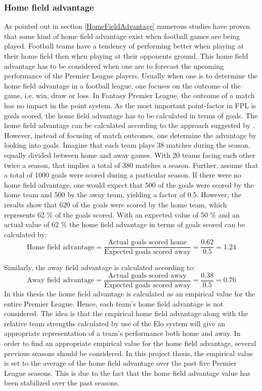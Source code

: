\subsubsection{Home field advantage}
As pointed out in section \ref{HomeFieldAdvantage} numerous studies have proven that some kind of home field advantage exist when football games are being played. Football teams have a tendency of performing better when playing at their home field then when playing at their opponents ground. This home field advantage has to be considered when one are to forecast the upcoming performance of the Premier League players. 
\newpar
Usually when one is to determine the home field advantage in a football league, one focuses on the outcome of the game, i.e.  win, draw or loss. In Fantasy Premier League, the outcome of a match has no impact in the point system. As the most important point-factor in FPL is goals scored, the home field advantage has to be calculated in terms of goals. 
\newpar
The home field advantage can be calculated according to the approach suggested by \cite{Pollard}. However, instead of focusing of match outcomes, one determine the advantage by looking into goals. Imagine that each team plays 38 matches during the season, equally divided between home and away games. With 20 teams facing each other twice a season, that implies a total of 380 matches a season. Further, assume that a total of 1000 goals were scored during a particular season. If there were no home field advantage, one would expect that 500 of the goals were scored by the home team and 500 by the away team, yielding a factor of 0.5. However, the results show that 620 of the goals were scored by the home team, which represents 62 \% of the goals scored. With an expected value of 50 \% and an actual value of 62 \% the home field advantage in terms of goals scored can be calculated by: 
\begin{equation*}
    \textrm{Home field advantage} = \frac{\textrm{Actual goals scored home}}{\textrm{Expected goals scored away}} = \frac{0.62}{0.5} = 1.24 
\end{equation*}

Similarly, the away field advantage is calculated according to:
\begin{equation*}
    \textrm{Away field advantage} = \frac{\textrm{Actual goals scored away}}{\textrm{Expected goals scored away}} = \frac{0.38}{0.5} = 0.76
\end{equation*}
\newpar
In this thesis the home field advantage is calculated as an empirical value for the entire Premier League. Hence, each team's home field advantage is not considered. The idea is that the empirical home field advantage along with the relative team strengths calculated by use of the Elo system will give an appropriate representation of a team's performance both home and away. 
\newpar
In order to find an appropriate empirical value for the home field advantage, several previous seasons should be considered. In this project thesis, the empirical value is set to the average of the home field advantage over the past five Premier League seasons. This is due to the fact that the home field advantage value has been stabilized over the past seasons. 

